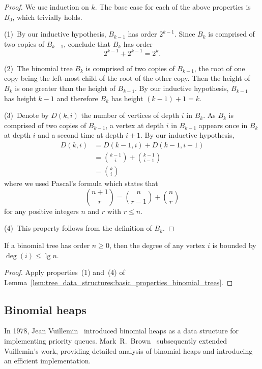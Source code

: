 \begin{proof}
We use induction on $k$. The base case for each of the above
properties is $B_0$, which trivially holds.

(1)~By our inductive hypothesis, $B_{k-1}$ has order $2^{k-1}$. Since
$B_k$ is comprised of two copies of $B_{k-1}$, conclude that $B_k$ has
order
\[
2^{k-1} + 2^{k-1}
=
2^k.
\]

(2)~The binomial tree $B_k$ is comprised of two copies of $B_{k-1}$,
the root of one copy being the left-most child of the root of the
other copy. Then the height of $B_k$ is one greater than the height of
$B_{k-1}$. By our inductive hypothesis, $B_{k-1}$ has height $k - 1$
and therefore $B_k$ has height $(k - 1) + 1 = k$.

(3)~Denote by $D(k,i)$ the number of vertices of depth $i$ in
$B_k$. As $B_k$ is comprised of two copies of $B_{k-1}$, a vertex at
depth $i$ in $B_{k-1}$ appears once in $B_k$ at depth $i$ and a second
time at depth $i + 1$. By our inductive hypothesis,
\begin{align*}
D(k,i)
&=
D(k-1, i) + D(k-1, i-1) \\[4pt]
&=
\binom{k-1}{i} + \binom{k-1}{i-1} \\[4pt]
&=
\binom{k}{i}
\end{align*}
where we used Pascal's formula which states that
\[
\binom{n+1}{r}
=
\binom{n}{r-1} + \binom{n}{r}
\]
for any positive integers $n$ and $r$ with $r \leq n$.

(4)~This property follows from the definition of $B_k$.
\end{proof}

\begin{corollary}
If a binomial tree has order $n \geq 0$, then the degree of any vertex
$i$ is bounded by $\deg(i) \leq \lg n$.
\end{corollary}

\begin{proof}
Apply properties~(1) and~(4) of
Lemma~\ref{lem:tree_data_structures:basic_properties_binomial_trees}.
\end{proof}



\subsection{Binomial heaps}

In 1978, Jean Vuillemin~\cite{Vuillemin1978}
introduced binomial heaps as a data structure for implementing
priority queues. Mark~R.~Brown~\cite{Brown1977,Brown1978} subsequently
extended Vuillemin's work, providing detailed analysis of binomial
heaps and introducing an efficient implementation.

